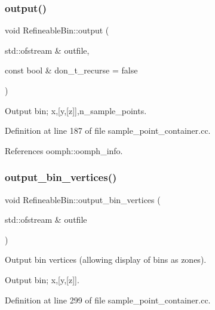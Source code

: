\mbox{\label{classRefineableBin_a52d935cc69527220005ecee7cfb2b5e8}} 
\subsubsection{\texorpdfstring{output()}{output()}}
{\footnotesize\ttfamily void Refineable\+Bin\+::output (\begin{DoxyParamCaption}\item[{std\+::ofstream \&}]{outfile,  }\item[{const bool \&}]{don\+\_\+t\+\_\+recurse = {\ttfamily false} }\end{DoxyParamCaption})}



Output bin; x,\mbox{[}y,\mbox{[}z\mbox{]}\mbox{]},n\+\_\+sample\+\_\+points. 



Definition at line 187 of file sample\+\_\+point\+\_\+container.\+cc.



References oomph\+::oomph\+\_\+info.

\mbox{\label{classRefineableBin_a71ceb55788e4d4f39986c138349a22f7}} 
\subsubsection{\texorpdfstring{output\+\_\+bin\+\_\+vertices()}{output\_bin\_vertices()}}
{\footnotesize\ttfamily void Refineable\+Bin\+::output\+\_\+bin\+\_\+vertices (\begin{DoxyParamCaption}\item[{std\+::ofstream \&}]{outfile }\end{DoxyParamCaption})}



Output bin vertices (allowing display of bins as zones). 

Output bin; x,\mbox{[}y,\mbox{[}z\mbox{]}\mbox{]}. 

Definition at line 299 of file sample\+\_\+point\+\_\+container.\+cc.



